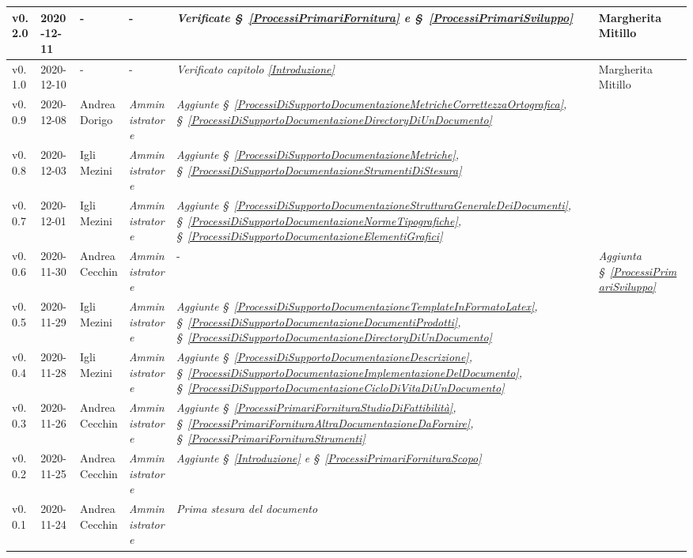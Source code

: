 {\begin{center}
\begin{longtable}[c]{|p{2cm-1\tabcolsep}|p{2cm}|p{3cm-2\tabcolsep}|p{3cm-1.5\tabcolsep}|p{}|p{3cm-2\tabcolsep}|}
		\hline
		\centering v0.2.0 & 2020-12-11 & \centering - & \centering -  & \textit{Verificate \S~\ref{ProcessiPrimariFornitura} e \S~\ref{ProcessiPrimariSviluppo} } & Margherita Mitillo \\
		\hline
		\centering v0.1.0 & 2020-12-10 & \centering - & \centering - & \textit{Verificato capitolo \ref{Introduzione}} & Margherita Mitillo  \\
		\hline
		\centering v0.0.9 & 2020-12-08 & Andrea Dorigo & \centering \textit{Amministratore} & \textit{Aggiunte  \S~\ref{ProcessiDiSupportoDocumentazioneMetricheCorrettezzaOrtografica}, \S~\ref{ProcessiDiSupportoDocumentazioneDirectoryDiUnDocumento}} & \makecell[c]{-}\\
		\hline
		\centering v0.0.8 & 2020-12-03 & Igli Mezini & \centering \textit{Amministratore} &  \textit{Aggiunte  \S~\ref{ProcessiDiSupportoDocumentazioneMetriche}, \S~\ref{ProcessiDiSupportoDocumentazioneStrumentiDiStesura}}&  \makecell[c]{-}\\
		\hline
		\centering v0.0.7 & 2020-12-01 & Igli Mezini & \centering \textit{Amministratore} &  \textit{Aggiunte  \S~\ref{ProcessiDiSupportoDocumentazioneStrutturaGeneraleDeiDocumenti}, \S~\ref{ProcessiDiSupportoDocumentazioneNormeTipografiche}, \S~\ref{ProcessiDiSupportoDocumentazioneElementiGrafici}} & \makecell[c]{-} \\
		\hline
		\centering v0.0.6 & 2020-11-30 & Andrea Cecchin & \centering \textit{Amministratore} & \centering - & \textit{Aggiunta  \S~\ref{ProcessiPrimariSviluppo}} \makecell[c]{-} \\
		\hline
		\centering v0.0.5 & 2020-11-29 & Igli Mezini & \centering \textit{Amministratore}  & \textit{Aggiunte  \S~\ref{ProcessiDiSupportoDocumentazioneTemplateInFormatoLatex}, \S~\ref{ProcessiDiSupportoDocumentazioneDocumentiProdotti}, \S~\ref{ProcessiDiSupportoDocumentazioneDirectoryDiUnDocumento}} &\makecell[c]{-} \\
		\hline
		\centering v0.0.4 & 2020-11-28 & Igli Mezini & \centering \textit{Amministratore} &  \textit{Aggiunte  \S~\ref{ProcessiDiSupportoDocumentazioneDescrizione}, \S~\ref{ProcessiDiSupportoDocumentazioneImplementazioneDelDocumento}, \S~\ref{ProcessiDiSupportoDocumentazioneCicloDiVitaDiUnDocumento}}  & \makecell[c]{-}\\
		\hline
		\centering v0.0.3 & 2020-11-26 & Andrea Cecchin & \centering \textit{Amministratore} &  \textit{Aggiunte \S~\ref{ProcessiPrimariFornituraStudioDiFattibilità}, \S~\ref{ProcessiPrimariFornituraAltraDocumentazioneDaFornire}, \S~\ref{ProcessiPrimariFornituraStrumenti}}  & \makecell[c]{-} \\
		\hline
		\centering v0.0.2 & 2020-11-25 & Andrea Cecchin & \centering \textit{Amministratore}  & \textit{Aggiunte \S~\ref{Introduzione} e \S~\ref{ProcessiPrimariFornituraScopo}}  &\makecell[c]{-} \\
		\hline
		\centering v0.0.1 & 2020-11-24 & Andrea Cecchin & \centering \textit{Amministratore}  & \textit{Prima stesura del documento} &\makecell[c]{-}  \\
		\hline
		

\end{longtable}
\end{center}}

